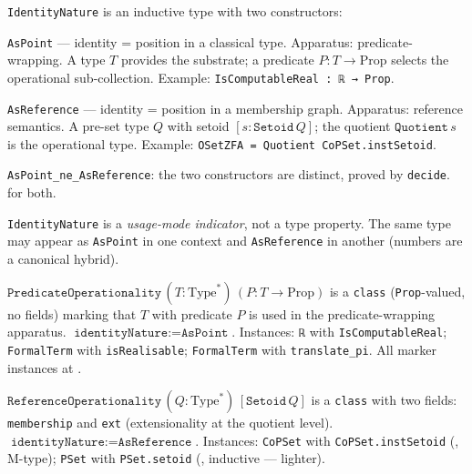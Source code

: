 \begin{definition}
\label{def:IdentityNature}
\leanok
\texttt{IdentityNature} is an inductive type with two constructors:

\texttt{AsPoint} --- identity = position in a classical type.  Apparatus:
predicate-wrapping.  A type $T$ provides the substrate; a predicate
$P : T \to \mathrm{Prop}$ selects the operational sub-collection.
Example: \texttt{IsComputableReal : ℝ → Prop}.

\texttt{AsReference} --- identity = position in a membership graph.
Apparatus: reference semantics.  A pre-set type $Q$ with setoid
$[s : \texttt{Setoid}\,Q]$; the quotient $\texttt{Quotient}\,s$ is the
operational type.  Example: \texttt{OSetZFA = Quotient CoPSet.instSetoid}.

\texttt{AsPoint\_ne\_AsReference}: the two constructors are distinct, proved by
\texttt{decide}.  \axiomprofile{[]} for both.

\texttt{IdentityNature} is a \emph{usage-mode indicator}, not a type
property.  The same type may appear as \texttt{AsPoint} in one context
and \texttt{AsReference} in another (numbers are a canonical hybrid).
\end{definition}

\begin{definition}
\label{def:PredicateOperationality}
\leanok
{}
$\texttt{PredicateOperationality}\,(T : \mathrm{Type}^*)\,(P : T \to \mathrm{Prop})$
is a \texttt{class} (\texttt{Prop}-valued, no fields) marking that $T$
with predicate $P$ is used in the predicate-wrapping apparatus.
$\texttt{identityNature} := \texttt{AsPoint}$.
Instances: \texttt{ℝ} with \texttt{IsComputableReal};
\texttt{FormalTerm} with \texttt{isRealisable};
\texttt{FormalTerm} with \texttt{translate\_pi}.
All marker instances at \axiomprofile{[]}.
\end{definition}

\begin{definition}
\label{def:ReferenceOperationality}
\leanok
{}
$\texttt{ReferenceOperationality}\,(Q : \mathrm{Type}^*)\,[\texttt{Setoid}\,Q]$
is a \texttt{class} with two fields: \texttt{membership} and \texttt{ext}
(extensionality at the quotient level).
$\texttt{identityNature} := \texttt{AsReference}$.
Instances: \texttt{CoPSet} with \texttt{CoPSet.instSetoid}
(, M-type);
\texttt{PSet} with \texttt{PSet.setoid}
(, inductive --- lighter).
\end{definition}

